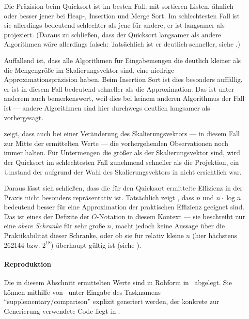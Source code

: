 Die Präzision beim Quicksort ist im besten Fall, mit sortieren Listen, ähnlich oder besser jener bei Heap-, Insertion und Merge Sort. Im schlechtesten Fall ist sie allerdings bedeutend schlechter als jene für andere, er ist langsamer als projeziert. (Daraus zu schließen, dass der Quicksort langsamer als andere Algorithmen wäre allerdings falsch: Tatsächlich ist er deutlich schneller, siehe .)

Auffallend ist, dass alle Algorithmen für Eingabemengen die deutlich kleiner als die Mengengröße im Skalierungsvektor sind, eine niedrige Approximationspräzision haben. Beim Insertion Sort ist dies besonders auffällig, er ist in diesem Fall bedeutend schneller als die Approximation. Das ist unter anderem auch bemerkenswert, weil dies bei keinem anderen Algorithmus der Fall ist --- andere Algorithmen sind hier durchwegs deutlich langsamer als vorhergesagt.



 zeigt, dass auch bei einer Veränderung des Skalierungsvektors --- in diesem Fall zur Mitte der ermittelten Werte --- die vorhergehenden Observationen noch immer halten. Für Untermengen die größer als der Skalierungsvektor sind, wird der Quicksort im schlechtesten Fall zunehmend schneller als die Projektion, ein Umstand der aufgrund der Wahl des Skalierungsvektors in  nicht ersichtlich war.

Daraus lässt sich schließen, dass die für den Quicksort ermittelte Effizienz in der Praxis nicht besonders repräsentativ ist. Tatsächlich zeigt , dass $n$ und $n \cdot \log{n}$ bedeutend besser für eine Approximation der praktischen Effizienz geeignet sind. Das ist eines der Defizite der $O$-Notation in diesem Kontext --- sie beschreibt nur eine \emph{obere Schranke} für sehr große $n$, macht jedoch keine Aussage über die Praktikabilität dieser Schranke, oder ob sie für relativ kleine $n$ (hier hächstens 262144 bzw. $2^18$) überhaupt gültig ist (siehe ).



\paragraph{Reproduktion} Die in diesem Abschnitt ermittelten Werte sind in Rohform in \crDataSupComparison\ abgelegt. Sie können mithilfe von \crScriptsGenerate\ unter Eingabe des Tasknamens \enquote{supplementary/comparison} explizit generiert werden, der konkrete zur Generierung verwendete Code liegt in \crScriptsReciprocalApprox.


